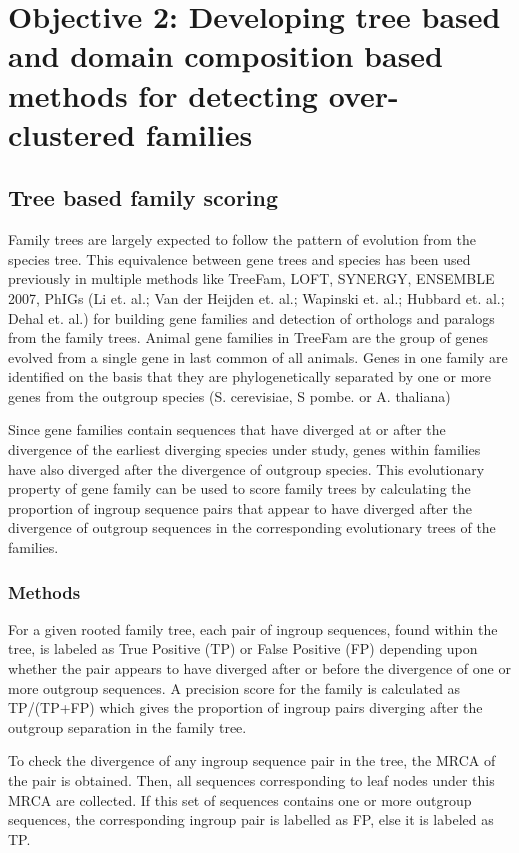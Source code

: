 \documentclass{article}
\begin{document}
			\pagebreak
	
	\section{Objective 2: Developing tree based and domain composition based methods for detecting over-clustered families}	
	\subsection{Tree based family scoring}
	Family trees are largely expected to follow the pattern of evolution from the species tree. This equivalence between gene trees and species has been used previously in multiple methods like TreeFam, LOFT, SYNERGY, ENSEMBLE 2007, PhIGs (Li et. al.; Van der Heijden et. al.; Wapinski et. al.; Hubbard et. al.; Dehal et. al.) for building gene families and detection of orthologs and paralogs from the family trees. Animal gene families in TreeFam are the group of genes evolved from a single gene in last common of all animals. Genes in one family are identified on the basis that they are phylogenetically separated by one or more genes from the outgroup species (S. cerevisiae, S pombe. or A. thaliana)
	
	Since gene families contain sequences that have diverged at or after the divergence of the earliest diverging species under study, genes within families have also diverged after the divergence of outgroup species. This evolutionary property of gene family can be used to score family trees by calculating the proportion of ingroup sequence pairs that appear to have diverged after the divergence of outgroup sequences in the corresponding evolutionary trees of the families.
		\subsubsection{Methods}
		For a given rooted family tree, each pair of ingroup sequences, found within the tree, is labeled as True Positive (TP) or False Positive (FP) depending upon whether the pair appears to have diverged after or before the divergence of one or more outgroup sequences. A precision score for the family is calculated  as TP/(TP+FP) which gives the proportion of ingroup pairs diverging after the outgroup separation in the family tree.
		
		To check the divergence of any ingroup sequence pair in the tree, the MRCA of the pair is obtained. Then, all sequences corresponding to leaf nodes under this MRCA are collected. If this set of sequences contains one or more outgroup sequences, the corresponding ingroup pair is labelled as FP, else it is labeled as TP.
		
\end{document}
